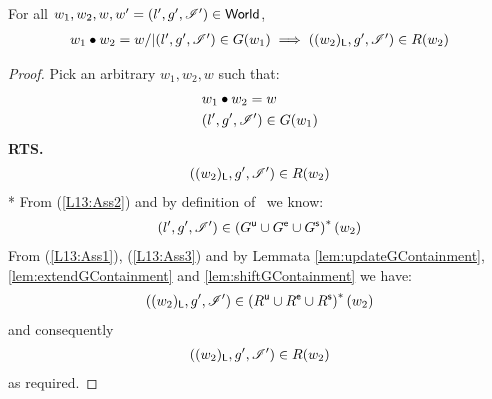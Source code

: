 %
\begin{lemma}[] \label{lem:guaranteeContainment}
%
For all $w_1, w_2, w, w' = (l', g', \mathscr{I}') \in \textsf{World}$,
\[
\begin{array}{l}
	w_1 \bullet w_2 = w /| (l', g', \mathscr{I}{}') \in G(w_1) \implies ((w_2)_{\textsf{L}}, g', \mathscr{I}') \in R(w_2)
\end{array}
\]
%
\begin{proof} Pick an arbitrary $w_1, w_2, w$ such that:
%
\begin{align}
	& w_1 \bullet w_2 = w \label{L13:Ass1}\\
	& (l', g', \mathscr{I}') \in G(w_1) \label{L13:Ass2}
\end{align}
%
\textbf{RTS.}
%
\begin{align*}
	((w_2)_{\textsf{L}}, g', \mathscr{I}') \in R(w_2) 
\end{align*}
*
From (\ref{L13:Ass2}) and by definition of \guarantee\ we know:
%
\begin{align}
	(l', g', \mathscr{I}') \in \left(G^{\textsf{u}} \cup G^{\textsf{e}} \cup G^{\textsf{s}} \right)^{*}(w_2) \label{L13:Ass3}
\end{align}
%
From (\ref{L13:Ass1}), (\ref{L13:Ass3}) and by Lemmata \ref{lem:updateGContainment}, \ref{lem:extendGContainment} and \ref{lem:shiftGContainment} we have:
%
\begin{align}
	((w_2)_{\textsf{L}}, g', \mathscr{I}') \in \left(R^{\textsf{u}} \cup R^{\textsf{e}} \cup R^{\textsf{s}} \right)^{*}(w_2) \nonumber
\end{align}
%
and consequently 
%
\begin{align}
	((w_2)_{\textsf{L}}, g', \mathscr{I}') \in R(w_2) \nonumber
\end{align}
%
as required.
\end{proof}
\end{lemma}
%
%
